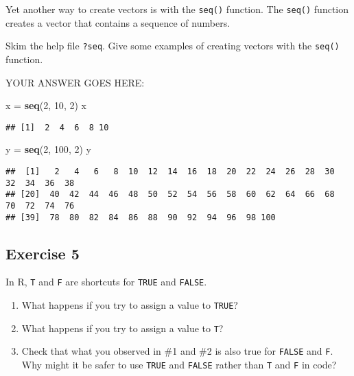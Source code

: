 \documentclass[
]{article}
\newenvironment{Shaded}{\begin{snugshade}}{\end{snugshade}}
\newcommand{\DecValTok}[1]{\textcolor[rgb]{0.00,0.00,0.81}{#1}}
\newcommand{\KeywordTok}[1]{\textcolor[rgb]{0.13,0.29,0.53}{\textbf{#1}}}
\newcommand{\NormalTok}[1]{#1}
\newcommand{\StringTok}[1]{\textcolor[rgb]{0.31,0.60,0.02}{#1}}
\begin{document}
Yet another way to create vectors is with the \texttt{seq()} function.
The \texttt{seq()} function creates a vector that contains a sequence of
numbers.

Skim the help file \texttt{?seq}. Give some examples of creating vectors
with the \texttt{seq()} function.

YOUR ANSWER GOES HERE:

\begin{Shaded}
\begin{Highlighting}[]
\NormalTok{x =}\StringTok{ }\KeywordTok{seq}\NormalTok{(}\DecValTok{2}\NormalTok{, }\DecValTok{10}\NormalTok{, }\DecValTok{2}\NormalTok{)}
\NormalTok{x}
\end{Highlighting}
\end{Shaded}

\begin{verbatim}
## [1]  2  4  6  8 10
\end{verbatim}

\begin{Shaded}
\begin{Highlighting}[]
\NormalTok{y =}\StringTok{ }\KeywordTok{seq}\NormalTok{(}\DecValTok{2}\NormalTok{, }\DecValTok{100}\NormalTok{, }\DecValTok{2}\NormalTok{)}
\NormalTok{y}
\end{Highlighting}
\end{Shaded}

\begin{verbatim}
##  [1]   2   4   6   8  10  12  14  16  18  20  22  24  26  28  30  32  34  36  38
## [20]  40  42  44  46  48  50  52  54  56  58  60  62  64  66  68  70  72  74  76
## [39]  78  80  82  84  86  88  90  92  94  96  98 100
\end{verbatim}

\hypertarget{exercise-5}{%
\subsection{Exercise 5}\label{exercise-5}}

In R, \texttt{T} and \texttt{F} are shortcuts for \texttt{TRUE} and
\texttt{FALSE}.

\begin{enumerate}
\def\labelenumi{\arabic{enumi}.}
\item
  What happens if you try to assign a value to \texttt{TRUE}?
\item
  What happens if you try to assign a value to \texttt{T}?
\item
  Check that what you observed in \#1 and \#2 is also true for
  \texttt{FALSE} and \texttt{F}. Why might it be safer to use
  \texttt{TRUE} and \texttt{FALSE} rather than \texttt{T} and \texttt{F}
  in code?
\end{enumerate}
\end{document}
